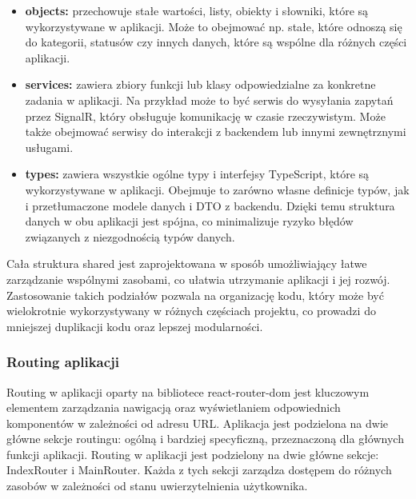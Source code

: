 \documentclass[12pt,a4paper]{article}
\begin{document}
\begin{itemize}
\begin{itemize}
        \item \textbf{objects:} przechowuje stałe wartości, listy, obiekty i słowniki, które są wykorzystywane w aplikacji. Może to obejmować np. stałe, które odnoszą się do kategorii, statusów czy innych danych, które są wspólne dla różnych części aplikacji.
        \item \textbf{services:} zawiera zbiory funkcji lub klasy odpowiedzialne za konkretne zadania w aplikacji. Na przykład może to być serwis do wysyłania zapytań przez SignalR, który obsługuje komunikację w czasie rzeczywistym. Może także obejmować serwisy do interakcji z backendem lub innymi zewnętrznymi usługami.
        \item \textbf{types:} zawiera wszystkie ogólne typy i interfejsy TypeScript, które są wykorzystywane w aplikacji. Obejmuje to zarówno własne definicje typów, jak i przetłumaczone modele danych i DTO z backendu. Dzięki temu struktura danych w obu aplikacji jest spójna, co minimalizuje ryzyko błędów związanych z niezgodnością typów danych.
    \end{itemize}
\end{itemize}

Cała struktura shared jest zaprojektowana w sposób umożliwiający łatwe zarządzanie wspólnymi zasobami, co ułatwia utrzymanie aplikacji i jej rozwój. Zastosowanie takich podziałów pozwala na organizację kodu, który może być wielokrotnie wykorzystywany w różnych częściach projektu, co prowadzi do mniejszej duplikacji kodu oraz lepszej modularności.


\newpage
\subsubsection{Routing aplikacji}
Routing w aplikacji oparty na bibliotece react-router-dom jest kluczowym elementem zarządzania nawigacją oraz wyświetlaniem odpowiednich komponentów w zależności od adresu URL. Aplikacja jest podzielona na dwie główne sekcje routingu: ogólną i bardziej specyficzną, przeznaczoną dla głównych funkcji aplikacji. Routing w aplikacji jest podzielony na dwie główne sekcje: IndexRouter i MainRouter. Każda z tych sekcji zarządza dostępem do różnych zasobów w zależności od stanu uwierzytelnienia użytkownika.
\\\\
\end{document}
